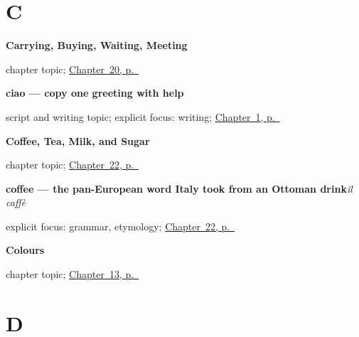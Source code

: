 \section*{C}

\noindent\begin{minipage}[t]{\linewidth}
\raggedright
\textbf{Carrying, Buying, Waiting, Meeting}\par
\footnotesize chapter topic; \hyperref[ch:it-carry-buy-wait-meet]{Chapter~20, p.~\pageref*{ch:it-carry-buy-wait-meet}}
\end{minipage}\par\smallskip

\noindent\begin{minipage}[t]{\linewidth}
\raggedright
\textbf{ciao — copy one greeting with help}\par
\footnotesize script and writing topic; explicit focus: writing; \hyperref[ch:greetings]{Chapter~1, p.~\pageref*{ch:greetings}}
\end{minipage}\par\smallskip

\noindent\begin{minipage}[t]{\linewidth}
\raggedright
\textbf{Coffee, Tea, Milk, and Sugar}\par
\footnotesize chapter topic; \hyperref[ch:it-coffee-tea-milk-sugar]{Chapter~22, p.~\pageref*{ch:it-coffee-tea-milk-sugar}}
\end{minipage}\par\smallskip

\noindent\begin{minipage}[t]{\linewidth}
\raggedright
\textbf{coffee — the pan-European word Italy took from an Ottoman drink}\enspace\emph{il caffè}\par
\footnotesize explicit focus: grammar, etymology; \hyperref[ch:it-coffee-tea-milk-sugar]{Chapter~22, p.~\pageref*{ch:it-coffee-tea-milk-sugar}}
\end{minipage}\par\smallskip

\noindent\begin{minipage}[t]{\linewidth}
\raggedright
\textbf{Colours}\par
\footnotesize chapter topic; \hyperref[ch:it-colours]{Chapter~13, p.~\pageref*{ch:it-colours}}
\end{minipage}\par\smallskip

\section*{D}

